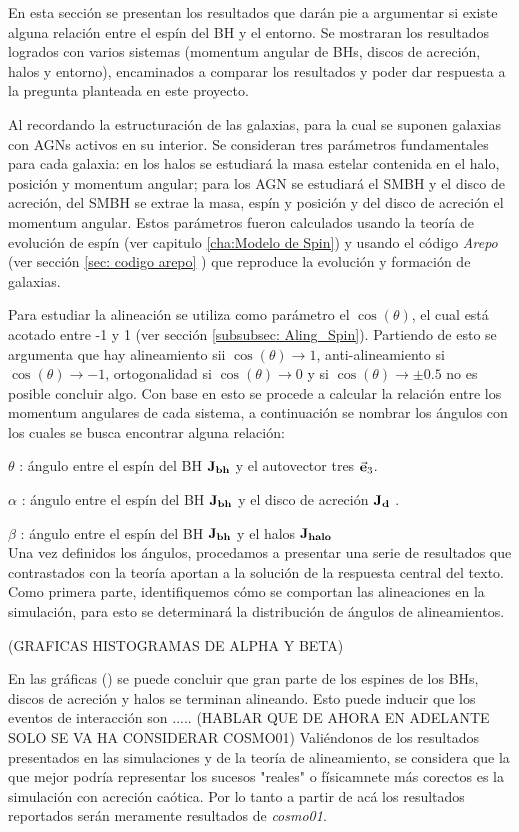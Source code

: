 En esta sección se presentan los resultados que darán pie a argumentar si existe alguna relación entre el espín del BH y el entorno. Se mostraran los resultados logrados con varios sistemas (momentum angular de BHs, discos de acreción, halos y entorno), encaminados a comparar los resultados y poder dar respuesta a la pregunta planteada en este proyecto. 

Al recordando la estructuración de las galaxias, para la cual  se suponen galaxias con AGNs activos en su interior. Se consideran tres parámetros fundamentales para cada galaxia: en los halos se estudiará la masa estelar contenida en el halo, posición y momentum angular; para los AGN se estudiará el SMBH y el disco de acreción, del SMBH se extrae la masa, espín y posición y del disco de acreción el momentum angular. Estos parámetros fueron calculados usando la teoría de evolución de espín (ver capitulo \ref{cha:Modelo de Spin}) y usando el código {\it{Arepo}} (ver sección \ref{sec: codigo arepo} ) que reproduce la evolución y formación de galaxias. 

Para estudiar la alineación se utiliza como parámetro el $\cos (\theta)$, el cual está acotado entre -1 y 1 (ver sección \ref{subsubsec: Aling_Spin}). Partiendo de esto se argumenta que hay alineamiento sii  $\cos (\theta) \to 1$, anti-alineamiento si $\cos (\theta)\to -1$, ortogonalidad si $\cos (\theta)\to 0$ y si $\cos (\theta)\to \pm 0.5 $ no es posible concluir algo. Con base en esto se procede a calcular la relación entre los momentum angulares de cada sistema, a continuación se nombrar los ángulos con los cuales se busca encontrar alguna relación:

$\theta$ : ángulo entre el espín del BH ${\bf{J_{bh}}}$ y el autovector tres $\vec{\bf{e}}_{3}$.

$\alpha$ : ángulo entre el espín del BH ${\bf{J_{bh}}}$  y el disco de acreción ${\bf{J_{d}}}$ .

$\beta$ :  ángulo entre el espín del BH ${\bf{J_{bh}}}$ y el halos ${\bf{J_{halo}}}$\\

Una vez definidos los ángulos, procedamos a presentar una serie de resultados que contrastados con la teoría aportan a la solución de la respuesta central del texto. Como primera parte, identifiquemos cómo se comportan las alineaciones en la simulación, para esto se determinará la distribución de ángulos de alineamientos. 


(GRAFICAS HISTOGRAMAS DE ALPHA Y BETA)

En las gráficas () se puede concluir que gran parte de los espines de los BHs, discos de acreción y halos se terminan alineando. Esto puede inducir que los eventos de interacción son .....
(HABLAR QUE DE AHORA EN ADELANTE SOLO SE VA HA CONSIDERAR COSMO01)
Valiéndonos de los resultados presentados en las simulaciones y de la teoría de alineamiento, se considera que la que mejor podría representar los sucesos "reales" o físicamnete más corectos es la simulación con acreción caótica. Por lo tanto a partir de acá los resultados reportados serán meramente resultados de {\it{cosmo01}}. 

